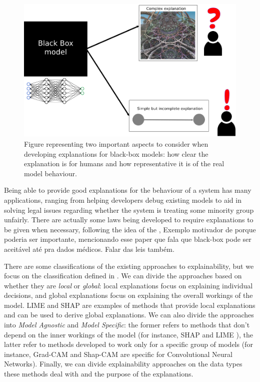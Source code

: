 \begin{figure}[ht]
\centering
\includegraphics[width=\textwidth]{blackBox}
\caption{Figure representing two important aspects to consider when developing explanations for black-box models: how clear the explanation is for humans and how representative it is of the real model behaviour.}\label{fig:blackBox}
\end{figure}

Being able to provide good explanations for the behaviour of a system has many applications, ranging from helping developers debug existing models to aid in solving legal issues regarding whether the system is treating some minority group unfairly. There are actually some laws being developed to require explanations to be given when necessary, following the idea of the , 
{\color{red} Exemplo motivador de porque poderia ser importante, mencionando esse paper  que fala que black-box pode ser aceitável até pra dados médicos. Falar das leis  também.}

There are some classifications of the existing approaches to explainability, but we focus on the classification defined in \cite{linardatos2020explainable}. We can divide the approaches based on whether they are \emph{local} or \emph{global}: local explanations focus on explaining individual decisions, and global explanations focus on explaining the overall workings of the model. LIME \cite{ribeiro2016should} and SHAP \cite{lundberg2017unified} are examples of methods that provide local explanations and can be used to derive global explanations. We can also divide the approaches into \emph{Model Agnostic} and \emph{Model Specific}: the former refers to methods that don't depend on the inner workings of the model (for instance, SHAP \cite{lundberg2017unified} and LIME \cite{ribeiro2016should}), the latter refer to methods developed to work only for a specific group of models (for instance, Grad-CAM and Shap-CAM are specific for Convolutional Neural Networks). Finally, we can divide explainability approaches on the data types these methods deal with and the purpose of the explanations.

